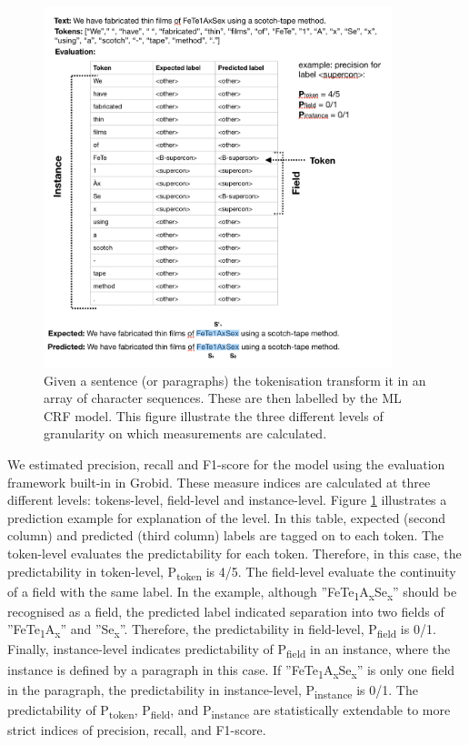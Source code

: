 \documentclass{article}[a4]
\begin{document}
\begin{figure}[h!]
    \centering
    \includegraphics[width=4in]{example-output}
    \caption{Given a sentence (or paragraphs) the tokenisation transform it in an array of character sequences. These are then labelled by the ML CRF model. This figure illustrate the three different levels of granularity on which measurements are calculated.}
    \label{fig:levels-measurement}
\end{figure}

We estimated precision, recall and F1-score for the model using the evaluation framework built-in in Grobid. These measure indices are calculated at three different levels: tokens-level, field-level and instance-level. Figure \ref{fig:levels-measurement} illustrates a prediction example for explanation of the level. 
In this table, expected (second column) and predicted (third column) labels are tagged on to each token. 
The token-level evaluates the predictability for each token. Therefore, in this case, the predictability in token-level, P\textsubscript{token} is 4/5. The field-level evaluate the continuity of a field with the same label. In the example, although ”FeTe\textsubscript{1}A\textsubscript{x}Se\textsubscript{x}” should be recognised as a field, the predicted label indicated separation into two fields of ”FeTe\textsubscript{1}A\textsubscript{x}” and ”Se\textsubscript{x}”. Therefore, the predictability in field-level, P\textsubscript{field} is 0/1. Finally, instance-level indicates predictability of P\textsubscript{field} in an instance, where the instance is defined by a paragraph in this case. 
If ”FeTe\textsubscript{1}A\textsubscript{x}Se\textsubscript{x}” is only one field in the paragraph, the predictability in instance-level, P\textsubscript{instance} is 0/1. The predictability of P\textsubscript{token}, P\textsubscript{field}, and P\textsubscript{instance} are statistically extendable to more strict indices of precision, recall, and F1-score.
\end{document}
